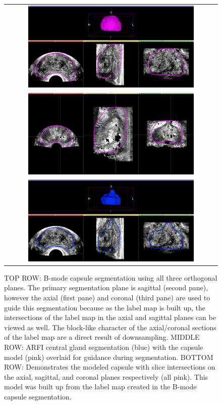 \begin{figure}[htb!]
\centering
\begin{tabular}{c}
\includegraphics[width=0.8\textwidth]{zach/us_capsule_seg_model.png} \\
\includegraphics[width=0.8\textwidth]{zach/arfi_central_seg.png} \\
\includegraphics[width=0.8\textwidth]{zach/us_central_seg_model.png} \\
\end{tabular}
\caption{TOP ROW: B-mode capsule segmentation using all three orthogonal
    planes.  The primary segmentation plane is sagittal (second pane), however
    the axial (first pane) and coronal (third pane) are used to guide this
    segmentation because as the label map is built up, the intersections of
    the label map in the axial and sagittal planes can be viewed as well. The
    block-like character of the axial/coronal sections of the label map are a
    direct result of downsampling.  MIDDLE ROW: ARFI central gland segmentation
    (blue) with the capsule model (pink) overlaid for guidance during
    segmentation.  BOTTOM ROW: Demonstrates the modeled capsule with slice
    intersections on the axial, sagittal, and coronal planes respectively (all
    pink). This model was built up from the label map created in the B-mode
    capsule segmentation.}
\label{fig:arfi_segs} 
\end{figure}
